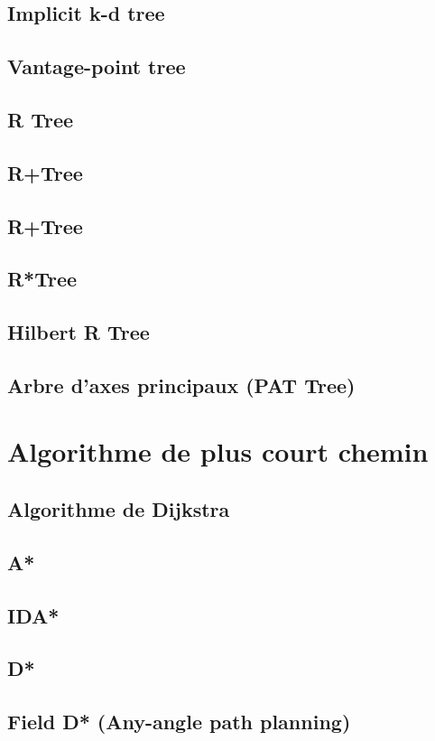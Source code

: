 \subsection{Implicit k-d tree}
\subsection{Vantage-point tree}
\subsection{R Tree}
\subsection{R+Tree}
\subsection{R+Tree}
\subsection{R*Tree}
\subsection{Hilbert R Tree}
\subsection{Arbre d'axes principaux (PAT Tree)}

%
\section{Algorithme de plus court chemin}
\subsection{Algorithme de Dijkstra}
\subsection{A*}
\subsection{IDA*}
\subsection{D*}
\subsection{Field D* (Any-angle path planning)}
